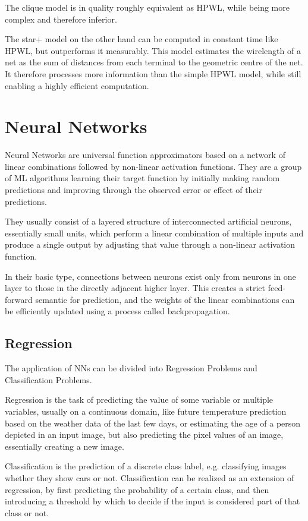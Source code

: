 The clique model is in quality roughly equivalent as \gls{HPWL}\cite{star-plus-paper}, while being more complex and therefore inferior.

The star+ model on the other hand can be computed in constant time like \gls{HPWL}, but outperforms it measurably. This model estimates the wirelength of a net as the sum of distances from each terminal to the geometric centre of the net. It therefore processes more information than the simple \gls{HPWL} model, while still enabling a highly efficient computation.\cite{star-plus-paper}

\section{Neural Networks}

Neural Networks are universal function approximators based on a network of linear combinations followed by non-linear activation functions. They are a group of \gls{ML} algorithms learning their target function by initially making random predictions and improving through the observed error or effect of their predictions.

They usually consist of a layered structure of interconnected artificial neurons, essentially small units, which perform a linear combination of multiple inputs and produce a single output by adjusting that value through a non-linear activation function.

In their basic type, connections between neurons exist only from neurons in one layer to those in the directly adjacent higher layer. This creates a strict feed-forward semantic for prediction, and the weights of the linear combinations can be efficiently updated using a process called backpropagation.

\subsection{Regression}

The application of \glspl{NN} can be divided into Regression Problems and Classification Problems. 

Regression is the task of predicting the value of some variable or multiple variables, usually on a continuous domain, like future temperature prediction based on the weather data of the last few days, or estimating the age of a person depicted in an input image, but also predicting the pixel values of an image, essentially creating a new image.

Classification is the prediction of a discrete class label, e.g. classifying images whether they show cars or not. Classification can be realized as an extension of regression, by first predicting the probability of a certain class, and then introducing a threshold by which to decide if the input is considered part of that class or not.

